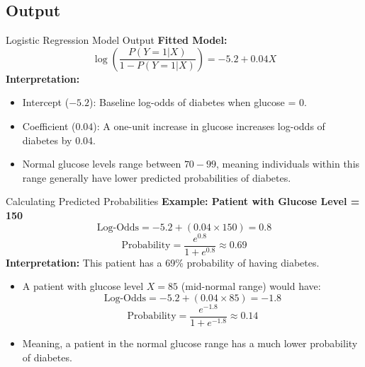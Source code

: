 \documentclass[aspectratio=169,xcolor=dvipsnames]{beamer}
\begin{document}
\subsection{Output}
\begin{frame}{Logistic Regression Model Output}
    \textbf{Fitted Model:}
    \begin{equation}
        \log \left( \frac{P(Y=1 | X)}{1 - P(Y=1 | X)} \right) = -5.2 + 0.04X
    \end{equation}
    \textbf{Interpretation:}
    \begin{itemize}
        \item Intercept (\(-5.2\)): Baseline log-odds of diabetes when glucose = 0.
        \item Coefficient (\(0.04\)): A one-unit increase in glucose increases log-odds of diabetes by 0.04.
        \item Normal glucose levels range between \(70-99\), meaning individuals within this range generally have lower predicted probabilities of diabetes.
    \end{itemize}
\end{frame}

\begin{frame}{Calculating Predicted Probabilities}
    \textbf{Example: Patient with Glucose Level = 150}
    \begin{equation}
        \text{Log-Odds} = -5.2 + (0.04 \times 150) = 0.8
    \end{equation}
    \begin{equation}
        \text{Probability} = \frac{e^{0.8}}{1 + e^{0.8}} \approx 0.69
    \end{equation}
    \textbf{Interpretation:} This patient has a 69\% probability of having diabetes.
    \begin{itemize}
        \item A patient with glucose level \(X = 85\) (mid-normal range) would have:
        \begin{equation}
            \text{Log-Odds} = -5.2 + (0.04 \times 85) = -1.8
        \end{equation}
        \begin{equation}
            \text{Probability} = \frac{e^{-1.8}}{1 + e^{-1.8}} \approx 0.14
        \end{equation}
        \item Meaning, a patient in the normal glucose range has a much lower probability of diabetes.
    \end{itemize}
\end{frame}
\end{document}
